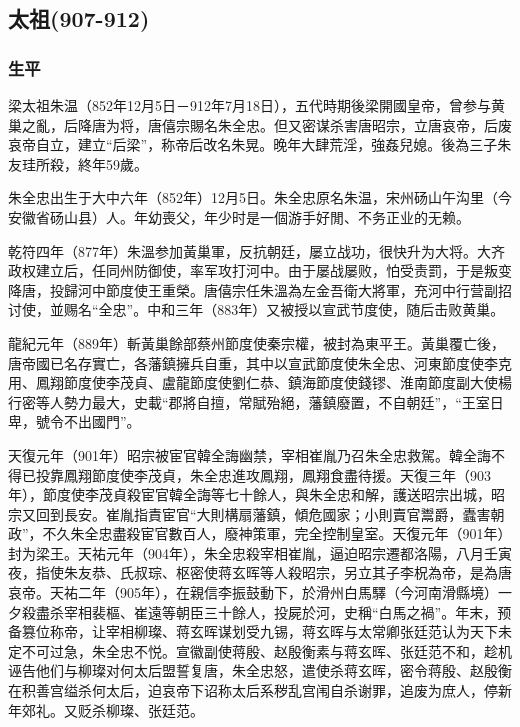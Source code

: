
\subsection{太祖\tiny(907-912)}

\subsubsection{生平}

梁太祖朱温（852年12月5日－912年7月18日），五代時期後梁開國皇帝，曾参与黄巢之亂，后降唐为将，唐僖宗賜名朱全忠。但又密谋杀害唐昭宗，立唐哀帝，后废哀帝自立，建立“后梁”，称帝后改名朱晃。晚年大肆荒淫，強姦兒媳。後為三子朱友珪所殺，終年59歲。

朱全忠出生于大中六年（852年）12月5日。朱全忠原名朱温，宋州砀山午沟里（今安徽省砀山县）人。年幼喪父，年少时是一個游手好閒、不务正业的无赖。

乾符四年（877年）朱溫参加黃巢軍，反抗朝廷，屡立战功，很快升为大将。大齐政权建立后，任同州防御使，率军攻打河中。由于屡战屡败，怕受责罰，于是叛变降唐，投歸河中節度使王重榮。唐僖宗任朱溫為左金吾衛大將軍，充河中行营副招讨使，並赐名“全忠”。中和三年（883年）又被授以宣武节度使，随后击败黄巢。

龍紀元年（889年）斬黃巢餘部蔡州節度使秦宗權，被封為東平王。黃巢覆亡後，唐帝國已名存實亡，各藩鎮擁兵自重，其中以宣武節度使朱全忠、河東節度使李克用、鳳翔節度使李茂貞、盧龍節度使劉仁恭、鎮海節度使錢镠、淮南節度副大使楊行密等人勢力最大，史載“郡將自擅，常賦殆絕，藩鎮廢置，不自朝廷”，“王室日卑，號令不出國門”。

天復元年（901年）昭宗被宦官韓全誨幽禁，宰相崔胤乃召朱全忠救駕。韓全誨不得已投靠鳳翔節度使李茂貞，朱全忠進攻鳳翔，鳳翔食盡待援。天復三年（903年），節度使李茂貞殺宦官韓全誨等七十餘人，與朱全忠和解，護送昭宗出城，昭宗又回到長安。崔胤指責宦官“大則構扇藩鎮，傾危國家；小則賣官鬻爵，蠹害朝政”，不久朱全忠盡殺宦官數百人，廢神策軍，完全控制皇室。天復元年（901年）封为梁王。天祐元年（904年），朱全忠殺宰相崔胤，逼迫昭宗遷都洛陽，八月壬寅夜，指使朱友恭、氏叔琮、枢密使蒋玄晖等人殺昭宗，另立其子李柷為帝，是為唐哀帝。天祐二年（905年），在親信李振鼓動下，於滑州白馬驛（今河南滑縣境）一夕殺盡杀宰相裴樞、崔遠等朝臣三十餘人，投屍於河，史稱“白馬之禍”。年末，预备篡位称帝，让宰相柳璨、蒋玄晖谋划受九锡，蒋玄晖与太常卿张廷范认为天下未定不可过急，朱全忠不悦。宣徽副使蒋殷、赵殷衡素与蒋玄晖、张廷范不和，趁机诬告他们与柳璨对何太后盟誓复唐，朱全忠怒，遣使杀蒋玄晖，密令蒋殷、赵殷衡在积善宫缢杀何太后，迫哀帝下诏称太后系秽乱宫闱自杀谢罪，追废为庶人，停新年郊礼。又贬杀柳璨、张廷范。

